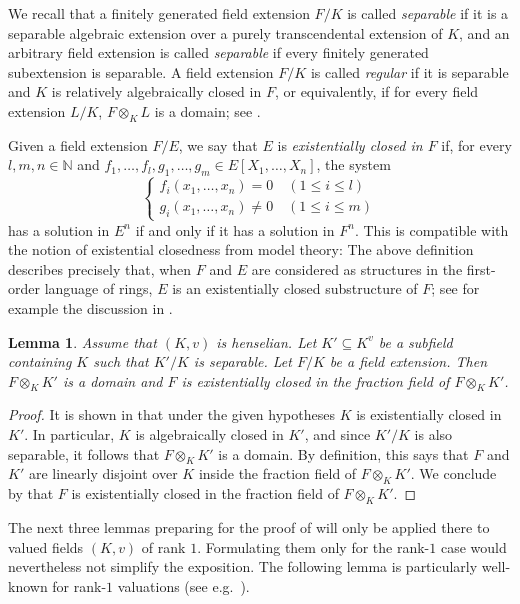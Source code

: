 \documentclass[12pt,leqno]{amsart}
\newcommand{\nat}{\mathbb{N}}
\renewcommand{\leq}{\leqslant}
\numberwithin{equation}{section}
\newtheorem{lem}[equation]{Lemma}
\theoremstyle{definition}
\theoremstyle{plain}
\begin{document}
We recall that a finitely generated field extension $F/K$ is called \emph{separable} if it is a separable algebraic extension over a purely transcendental extension of $K$, and an arbitrary field extension is called  \emph{separable} if every finitely generated subextension is separable.
A field extension $F/K$ is called \emph{regular} if it is separable and $K$ is relatively algebraically closed in $F$, or equivalently, if for every field extension $L/K$, $F\otimes_KL$ is a domain; see \cite[Chap.~V, {\S}17, N$^\circ$ 5]{BouAlg}.

Given a field extension $F/E$, we say that $E$ is \emph{existentially closed in $F$} if, for every $l,m,n\in \nat$ and $f_1, \ldots, f_l, g_1, \ldots, g_m \in E[X_1, \ldots, X_n]$, the system
\[\begin{cases}
f_i(x_1, \ldots, x_n) = 0 \quad (1\leq i\leq l)\\
g_i(x_1, \ldots, x_n) \neq 0 \quad (1\leq i\leq m)
\end{cases}\]
has a solution in $E^n$ if and only if it has a solution in $F^n$.
This is compatible with the notion of existential closedness from model theory: The above definition describes precisely that, when $F$ and $E$ are considered as structures in the first-order language of rings, $E$ is an existentially closed substructure of $F$; see for example the discussion in \cite[Section 7.1]{Hodges}.

\begin{lem}\label{L:hens-extclo}
Assume that $(K,v)$ is henselian. Let $K'\subseteq K^v$ be a subfield containing $K$ such that $K'/K$ is separable.
Let $F/K$ be a field extension.
Then $F\otimes_K K'$ is a domain and $F$ is existentially closed in the fraction field of $F\otimes_K K'$.
\end{lem}
\begin{proof}
It is shown in \cite[Theorem 5.9]{Kuh14} that under the given hypotheses $K$ is existentially closed in $K'$. In particular, $K$ is algebraically closed in $K'$, and since $K'/K$ is also separable, it follows that  $F\otimes_K K'$ is a domain.
By definition, this says that $F$ and $K'$ are linearly disjoint over $K$ inside the fraction field of $F \otimes_K K'$.
We conclude by \cite[Lemma 7.2]{DDF21} that $F$ is existentially closed in the fraction field of $F\otimes_K K'$.
\end{proof}

The next three lemmas preparing for the proof of  will only be applied there to valued fields $(K,v)$ of rank $1$.
Formulating them only for the rank-$1$ case would nevertheless not simplify the exposition.
The following lemma is particularly well-known for rank-$1$ valuations (see e.g.~\cite[Sect.~1.2, p.~14]{EP05}).
\end{document}
